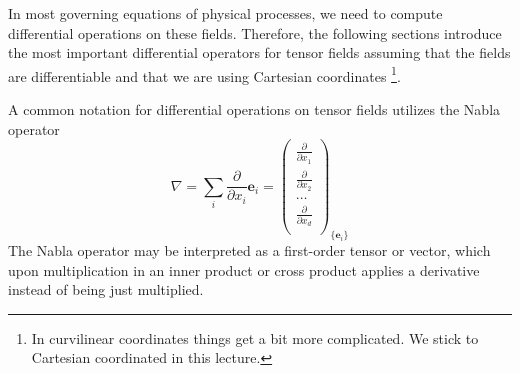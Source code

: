 In most governing equations of physical processes, we need to compute differential operations on these fields. Therefore, the following sections introduce the most important differential operators for tensor fields assuming that the fields are differentiable and that we are using Cartesian coordinates \footnote{In curvilinear coordinates things get a bit more complicated. We stick to Cartesian coordinated in this lecture. }. 

A common notation for differential operations on tensor fields utilizes the Nabla operator 
\begin{equation}
    \nabla = \sum_i \frac{\partial }{\partial x_i} \mathbf{e}_i = 
    \begin{pmatrix}
            \frac{\partial}{\partial x_1} \\
            \frac{\partial}{\partial x_2} \\
            \dots \\
            \frac{\partial}{\partial x_d} \\
        \end{pmatrix}_{\{\mathbf{e}_i\}}
\end{equation}
The Nabla operator may be interpreted as a first-order tensor or vector, which upon multiplication in an inner product or cross product applies a derivative instead of being just multiplied. 

